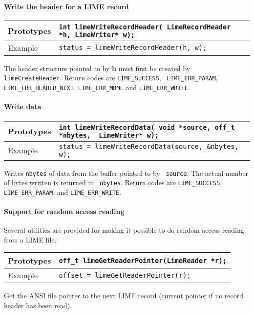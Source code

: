 \documentclass{article}
\begin{document}
\paragraph{Write the header for a LIME record}
%
\begin{flushleft}
  \begin{tabular}{|l|l|}
  \hline
  Prototypes     & \verb|int limeWriteRecordHeader( LimeRecordHeader *h, LimeWriter* w);| \\
\hline
  Example  & \verb|status = limeWriteRecordHeader(h, w);| \\
   \hline
 \end{tabular}
\end{flushleft}
%
The header structure pointed to by {\bf h} must first be created by
{\tt limeCreateHeader}.  Return codes are {\tt LIME\_SUCCESS}, {\tt
LIME\_ERR\_PARAM}, {\tt LIME\_ERR\_HEADER\_NEXT}, {\tt LIME\_ERR\_MBME} and
{\tt LIME\_ERR\_WRITE}.

\paragraph{Write data}
%
\begin{flushleft}
  \begin{tabular}{|l|l|}
  \hline
  Prototypes     & \verb|int limeWriteRecordData( void *source, off_t *nbytes,  LimeWriter* w);| \\
\hline
  Example  & \verb|status = limeWriteRecordData(source, &nbytes, w);| \\
   \hline
 \end{tabular}
\end{flushleft}
%
Writes {\tt nbytes} of data from the buffer pointed to by {\tt
source}.  The actual number of bytes written is returned in {\tt
nbytes}.  Return codes are {\tt LIME\_SUCCESS}, {\tt LIME\_ERR\_PARAM},
and {\tt LIME\_ERR\_WRITE}.

\paragraph{Support for random access reading}

Several utilities are provided for making it possible to do random
access reading from a LIME file.

%
\begin{flushleft}
  \begin{tabular}{|l|l|}
  \hline
  Prototypes     & \verb|off_t limeGetReaderPointer(LimeReader *r);| \\
\hline
  Example  & \verb|offset = limeGetReaderPointer(r);| \\
   \hline
 \end{tabular}
\end{flushleft}
%
Get the ANSI file pointer to the next LIME record (current pointer if
no record header has been read).
\end{document}

